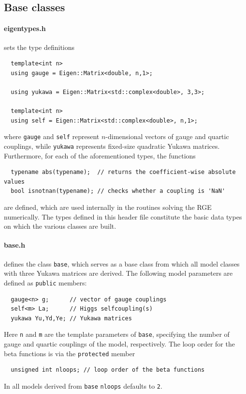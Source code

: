 \documentclass[11pt,a4paper]{article}
\begin{document}
\subsection{\label{sec::base} Base classes}
\paragraph{eigentypes.h}
sets the type definitions
\begin{lstlisting}
  template<int n>
  using gauge = Eigen::Matrix<double, n,1>;
   
  using yukawa = Eigen::Matrix<std::complex<double>, 3,3>;

  template<int n>
  using self = Eigen::Matrix<std::complex<double>, n,1>;
\end{lstlisting}
where \texttt{gauge} and \texttt{self} represent $n$-dimensional vectors of gauge and quartic couplings, while \texttt{yukawa} represents fixed-size quadratic Yukawa matrices.
Furthermore, for each of the aforementioned types, the functions
\begin{lstlisting}
  typename abs(typename);  // returns the coefficient-wise absolute values
  bool isnotnan(typename); // checks whether a coupling is 'NaN'
\end{lstlisting}
are defined, which are used internally in the routines solving the RGE numerically.
The types defined in this header file constitute the basic data types on which the various classes are built.

\paragraph{base.h}
defines the class \texttt{base}, which serves as a base class from which all model classes with three Yukawa matrices are derived. The following model parameters are defined as \texttt{public} members:
\begin{lstlisting}
  gauge<n> g;      // vector of gauge couplings
  self<m> La;      // Higgs selfcoupling(s)
  yukawa Yu,Yd,Ye; // Yukawa matrices
\end{lstlisting}
Here \texttt{n} and \texttt{m} are the template parameters of \texttt{base}, specifying the number of gauge and quartic couplings of the model, respectively.
The loop order for the beta functions is via the \texttt{protected} member
\begin{lstlisting}
  unsigned int nloops; // loop order of the beta functions
\end{lstlisting}
In all models derived from \texttt{base} \texttt{nloops} defaults to \texttt{2}.
\end{document}
